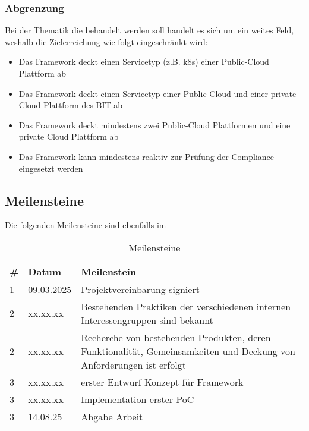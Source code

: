 \subsubsection{Abgrenzung}

Bei der Thematik die behandelt werden soll handelt es sich um ein weites Feld, weshalb die Zielerreichung wie folgt eingeschränkt wird:

\begin{itemize}
    \item Das Framework deckt einen Servicetyp (z.B. k8s) einer Public-Cloud Plattform ab
    \item Das Framework deckt einen Servicetyp einer Public-Cloud und einer private Cloud Plattform des BIT ab
    \item Das Framework deckt mindestens zwei Public-Cloud Plattformen und eine private Cloud Plattform ab
    \item Das Framework kann mindestens reaktiv zur Prüfung der Compliance eingesetzt werden
\end{itemize}

\subsection{Meilensteine}

Die folgenden Meilensteine sind ebenfalls im 

\begin{table}[H]
    \centering
    \begin{tabularx}{\textwidth}{|l|l|X|}
        \hline
        \textbf{\#} & \textbf{Datum} & \textbf{Meilenstein} \\
        \hline
        1 & 09.03.2025 & Projektvereinbarung signiert
        \\
        \hline
        2 & xx.xx.xx & Bestehenden Praktiken der verschiedenen internen Interessengruppen sind bekannt
        \\
        \hline
        2 & xx.xx.xx & Recherche von bestehenden Produkten, deren Funktionalität, Gemeinsamkeiten und Deckung von Anforderungen ist erfolgt
        \\
        \hline
        3 & xx.xx.xx & erster Entwurf Konzept für Framework
        \\
        \hline
        3 & xx.xx.xx & Implementation erster PoC
        \\
        \hline
        3 & 14.08.25 & Abgabe Arbeit
        \\
        \hline
    \end{tabularx}
    \caption{Meilensteine}
    \label{tab:milestones}
\end{table}